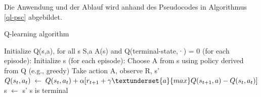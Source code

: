 Die Anwendung und der Ablauf wird anhand des Pseudocodes in Algorithmus \ref{ql-psc} abgebildet.

\begin{algorithm}
	\caption{Q-learning algorithm}
	\label{ql-psc}
	\begin{algorithmic}[1]
		\State Initialize Q(s,a), for all s \textepsilon S,a \textepsilon A(s) and Q(terminal-state,·) = 0
		\Repeat (for each episode):
		\State Initialize s
		\Repeat (for each episode):
		\State Choose A from s using policy derived from Q (e.g., greedy)
		\State Take action A, observe R, s'
		\State $Q(s_t,a_t)\;\leftarrow\;Q(s_t,a_t) + \alpha [ r_{t+1} + \gamma \textunderset{a}{max}
		Q(s_{t+1},a) - Q(s_t,a_t) ]$
		\State s $\leftarrow $ s' 
		\Until s is terminal
	\end{algorithmic}
\end{algorithm}

